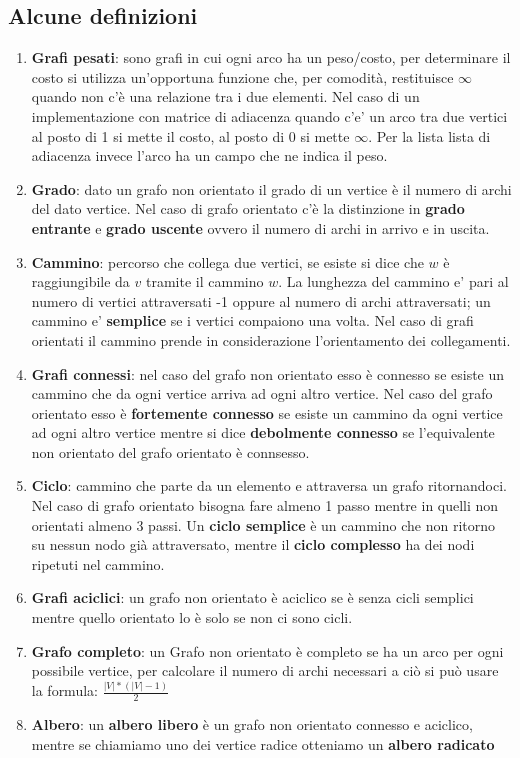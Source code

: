 \documentclass{article}
\begin{document}
\subsection{Alcune definizioni}
\begin{enumerate}
    \item \textbf{Grafi pesati}: sono grafi in cui ogni arco ha un peso/costo, per determinare il costo si utilizza un'opportuna funzione che, per comodità, restituisce $\infty$ quando non c'è una relazione tra i due elementi. 
    Nel caso di un implementazione con matrice di adiacenza quando c'e' un arco tra due vertici al posto di 1 si mette il costo, al posto di 0 si mette $\infty$.
    Per la lista lista di adiacenza invece l'arco ha un campo che ne indica il peso.
    \item \textbf{Grado}: dato un grafo non orientato il grado di un vertice è il numero di archi del dato vertice.
    Nel caso di grafo orientato c'è la distinzione in \textbf{grado entrante} e \textbf{grado uscente} ovvero il numero di archi in arrivo e in uscita.
    \item \textbf{Cammino}: percorso che collega due vertici, se esiste si dice che $w$ è raggiungibile da $v$ tramite il cammino $w$.
    La lunghezza del cammino e' pari al numero di vertici attraversati -1 oppure al numero di archi attraversati; 
    un cammino e' \textbf{semplice} se i vertici compaiono una volta.
    Nel caso di grafi orientati il cammino prende in considerazione l'orientamento dei collegamenti.
    \item \textbf{Grafi connessi}: nel caso del grafo non orientato esso è connesso se esiste un cammino che da ogni vertice arriva ad ogni altro vertice.
    Nel caso del grafo orientato esso è \textbf{fortemente connesso} se esiste un cammino da ogni vertice ad ogni altro vertice mentre si dice \textbf{debolmente connesso} se l'equivalente non orientato del grafo orientato è connsesso.
    \item \textbf{Ciclo}: cammino che parte da un elemento e attraversa un grafo ritornandoci. Nel caso di grafo orientato bisogna fare almeno 1 passo mentre in quelli non orientati almeno 3 passi.
    Un \textbf{ciclo semplice} è un cammino che non ritorno su nessun nodo già attraversato, mentre il \textbf{ciclo complesso} ha dei nodi ripetuti nel cammino.
    \item \textbf{Grafi aciclici}: un grafo non orientato è aciclico se è senza cicli semplici mentre quello orientato lo è solo se non ci sono cicli.
    \item \textbf{Grafo completo}: un Grafo non orientato è completo se ha un arco per ogni possibile vertice, per calcolare il numero di archi necessari a ciò si può usare la formula: $\frac{|V|*(|V|-1)} {2}$
    \item \textbf{Albero}: un \textbf{albero libero} è un grafo non orientato connesso e aciclico, mentre se chiamiamo uno dei vertice radice otteniamo un \textbf{albero radicato}
\end{enumerate}
\end{document}
